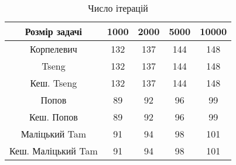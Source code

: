 \begin{table}[H]
	\centering
	\begin{tabular}{|c||c|c|c|c|}\hline
		Розмір задачі & 1000 & 2000 & 5000 & 10000 \\ \hline \hline
		Корпелевич & 132 & 137 & 144 & 148 \\ \hline
		Tseng & 132 & 137 & 144 & 148 \\ \hline
		Кеш. Tseng & 132 & 137 & 144 & 148 \\ \hline
		Попов & 89 & 92 & 96 & 99 \\ \hline
		Кеш. Попов & 89 & 92 & 96 & 99 \\ \hline
		Маліцький Tam & 91 & 94 & 98 & 101 \\ \hline
		Кеш. Маліцький Tam & 91 & 94 & 98 & 101 \\ \hline
	\end{tabular}
	\caption{Число ітерацій}
\end{table}
